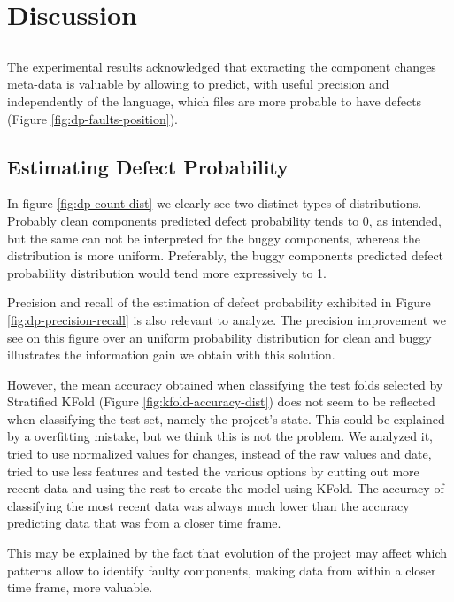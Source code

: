 \chapter{Discussion} \label{chap:discussion}

\section*{}

The experimental results acknowledged that extracting the component changes meta-data is valuable by allowing to predict, with useful precision and independently of the language, which files are more probable to have defects (Figure \ref{fig:dp-faults-position}).

\section{Estimating Defect Probability}

In figure \ref{fig:dp-count-dist} we clearly see two distinct types of distributions. 
Probably clean components predicted defect probability tends to $0$, as intended, but the same can not be interpreted for the buggy components, whereas the distribution is more uniform. Preferably, the buggy components predicted defect probability distribution would tend more expressively to 1.

Precision and recall of the estimation of defect probability exhibited in Figure \ref{fig:dp-precision-recall} is also relevant to analyze. The precision improvement we see on this figure over an uniform probability distribution for clean and buggy illustrates the information gain we obtain with this solution.

However, the mean accuracy obtained when classifying the test folds selected by Stratified KFold (Figure \ref{fig:kfold-accuracy-dist}) does not seem to be reflected when classifying the test set, namely the project's state. This could be explained by a overfitting mistake, but we think this is not the problem. We analyzed it, tried to use normalized values for changes, instead of the raw values and date, tried to use less features and tested the various options by cutting out more recent data and using the rest to create the model using KFold. The accuracy of classifying the most recent data was always much lower than the accuracy predicting data that was from a closer time frame. 

This may be explained by the fact that evolution of the project may affect which patterns allow to identify faulty components, making data from within a closer time frame, more valuable.


